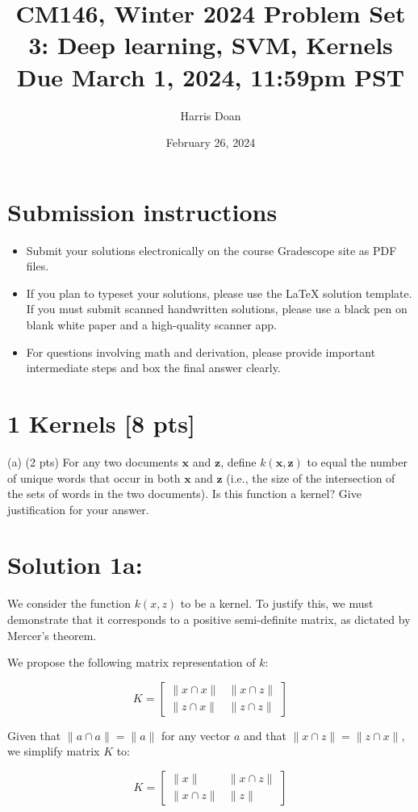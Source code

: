 \documentclass[10pt]{article}
\title{CM146, Winter 2024 
 Problem Set 3: Deep learning, SVM, Kernels 
 Due March 1, 2024, 11:59pm PST }
\author{Harris Doan}
\date{February 26, 2024}
\begin{document}
\maketitle
\section*{Submission instructions}
\begin{itemize}
  \item Submit your solutions electronically on the course Gradescope site as PDF files.
  \item If you plan to typeset your solutions, please use the LaTeX solution template. If you must submit scanned handwritten solutions, please use a black pen on blank white paper and a high-quality scanner app.
  \item For questions involving math and derivation, please provide important intermediate steps and box the final answer clearly.
\end{itemize}

\section*{1 Kernels [8 pts]}
(a) (2 pts) For any two documents $\boldsymbol{x}$ and $\boldsymbol{z}$, define $k(\boldsymbol{x}, \boldsymbol{z})$ to equal the number of unique words that occur in both $\boldsymbol{x}$ and $\boldsymbol{z}$ (i.e., the size of the intersection of the sets of words in the two documents). Is this function a kernel? Give justification for your answer.

\section*{Solution 1a:}
We consider the function $k(x, z)$ to be a kernel. To justify this, we must demonstrate that it corresponds to a positive semi-definite matrix, as dictated by Mercer's theorem.

We propose the following matrix representation of $k$:

\[
K = \begin{bmatrix}
    \| x \cap x \| & \| x \cap z \| \\
    \| z \cap x \| & \| z \cap z \|
\end{bmatrix}
\]

Given that $\| a \cap a \| = \| a \| $ for any vector $a$ and that $\| x \cap z \| = \| z \cap x \|$, we simplify matrix $K$ to:

\[
K = \begin{bmatrix}
    \| x \| & \| x \cap z \| \\
    \| x \cap z \| & \| z \|
\end{bmatrix}
\]
\end{document}
